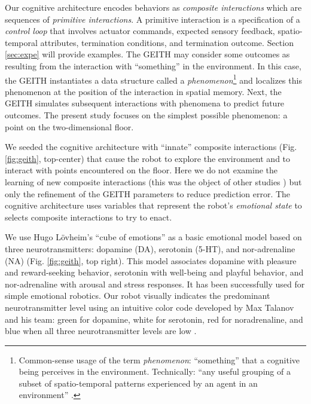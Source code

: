 \documentclass[runningheads]{llncs}
\begin{document}
Our cognitive architecture encodes behaviors as \textit{composite interactions} which are sequences of \textit{primitive interactions}.
A primitive interaction is a specification of a \textit{control loop} that involves actuator commands, expected sensory feedback, spatio-temporal attributes, termination conditions, and termination outcome. 
Section \ref{sec:expe} will provide examples. 
The GEITH may consider some outcomes as resulting from the interaction with ``something'' in the environment.
In this case, the GEITH instantiates a data structure called a \textit{phenomenon}\footnote{Common-sense usage of the term \textit{phenomenon}: ``something'' that a cognitive being perceives in the environment. Technically: ``any useful grouping of a subset of spatio-temporal patterns experienced by an agent in an environment'' \cite[p. 8]{thorisson_explanation_2021}.} and localizes this phenomenon at the position of the interaction in spatial memory.
Next, the GEITH simulates subsequent interactions with phenomena to predict future outcomes. 
The present study focuses on the simplest possible phenomenon: a point on the two-dimensional floor.

We seeded the cognitive architecture with ``innate'' composite interactions (Fig. \ref{fig:geith}, top-center) that cause the robot to explore the environment and to interact with points encountered on the floor. 
Here we do not examine the learning of new composite interactions (this was the object of other studies \cite{georgeon_cash_2019}) but only the refinement of the GEITH parameters to reduce prediction error.
The cognitive architecture uses variables that represent the robot's \textit{emotional state} to selects composite interactions to try to enact.

We use Hugo Lövheim's ``cube of emotions'' \cite{lovheim_new_2012} as a basic emotional model based on three neurotransmitters: dopamine (DA), serotonin (5-HT), and nor-adrenaline (NA) (Fig. \ref{fig:geith}, top right).
This model associates dopamine with pleasure and reward-seeking behavior, serotonin with well-being and playful behavior, and nor-adrenaline with arousal and stress responses.
It has been successfully used for simple emotional robotics.
Our robot visually indicates the predominant neurotransmitter level using an intuitive color code developed by Max Talanov and his team: green for dopamine, white for serotonin, red for noradrenaline, and blue when all three neurotransmitter levels are low \cite{chebotareva_emotional_2019}.

\end{document}
